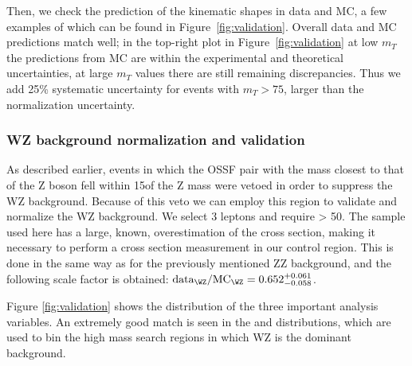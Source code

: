 Then, we check the prediction of the kinematic shapes in data and MC,
a few examples of which can be found in
Figure~\ref{fig:validation}. Overall data and MC predictions match well;
in the top-right plot in Figure~\ref{fig:validation} at low $m_T$ the
predictions from MC are within the experimental and theoretical
uncertainties, at large $m_T$ values there are still remaining
discrepancies. Thus we add 25\% systematic uncertainty for events with
$m_T> 75$\GeV, larger than the normalization uncertainty.

\subsubsection{WZ background normalization and validation}\label{sec:promptwz}
As described earlier, events in which the OSSF pair with the mass
closest to that of the Z boson fell within 15\GeV of the Z mass were
vetoed in order to suppress the WZ background. Because of this veto we
can employ this region to validate and normalize the WZ background. We
select 3 \ti  leptons and require \ptmiss> 50\GeV.
The sample used here has a large, known, overestimation of
the cross section, making it necessary to perform a cross section
measurement in our control region. This is done in the same way as for
the previously mentioned ZZ background, and the following scale factor
is obtained: $\text{data}_{\WZ}/\text{MC}_{\WZ}= 0.652_{-0.058}^{+0.061}$.

Figure \ref{fig:validation} shows the distribution of the three
important analysis variables. An extremely good match is seen in the
\mmin  and \mtmin  distributions, which are used to bin the high mass
search regions in which WZ is the dominant background.


